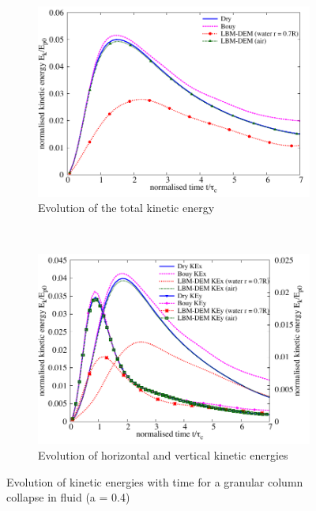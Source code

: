 \begin{figure}
\centering
\begin{subfigure}[t]{0.8\textwidth}
	\centering
    \includegraphics[width=\textwidth]{KE_a04f}
    \caption{Evolution of the total kinetic energy}
    \label{fig:KE_a04f}
\end{subfigure}
\\
\begin{subfigure}[t]{0.95\textwidth}
	\centering
    \includegraphics[width=\textwidth]{KExy_a04f}
    \caption{Evolution of horizontal and vertical kinetic energies}
    \label{fig:KExy_a04f}
\end{subfigure}
\caption{Evolution of kinetic energies with time for a granular column collapse 
in fluid (a = 0.4)}
\label{fig:a04f_energy}
\end{figure}

